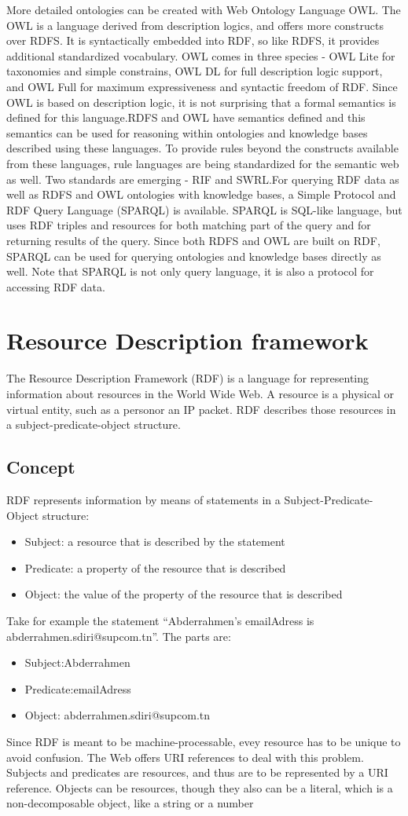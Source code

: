 \documentclass[a4paper,12pt,oneside]{report}
\begin{document}
{{More detailed ontologies can be created with Web Ontology Language OWL. The OWL is a language derived from description logics, and offers more constructs over RDFS. It is syntactically embedded into RDF, so like RDFS, it provides additional standardized vocabulary. OWL comes in three species - OWL Lite for taxonomies and simple constrains, OWL DL for full description logic support, and OWL Full for maximum expressiveness and syntactic freedom of RDF. Since OWL is based on description logic, it is not surprising that a formal semantics is defined for this language.RDFS and OWL have semantics defined and this semantics can be used for reasoning within ontologies and knowledge bases described using these languages. To provide rules beyond the constructs available from these languages, rule languages are being standardized for the semantic web as well. Two standards are emerging - RIF and SWRL.For querying RDF data as well as RDFS and OWL ontologies with knowledge bases, a Simple Protocol and RDF Query Language (SPARQL) is available. SPARQL is SQL-like language, but uses RDF triples and resources for both matching part of the query and for returning results of the query. Since both RDFS and OWL are built on RDF, SPARQL can be used for querying ontologies and knowledge bases directly as well. Note that SPARQL is not only query language, it is also a protocol for accessing RDF data.}
\section{Resource Description framework}
{The Resource Description Framework (RDF) is a language for representing information about resources in the World Wide Web. A resource is a physical or virtual entity, such as a personor an IP packet. RDF describes those resources in a subject-predicate-object structure.}
\subsection{Concept}
{RDF represents information by means of statements in a Subject-Predicate-Object structure:
\begin{itemize}
\item {Subject: a resource that is described by the statement}
\item {Predicate: a property of the resource that is described}
\item {Object: the value of the property of the resource that is described}
\end{itemize} 
{Take for example the statement “Abderrahmen's emailAdress is abderrahmen.sdiri@supcom.tn”. The parts are:
\begin{itemize}
\item {Subject:Abderrahmen }
\item {Predicate:emailAdress}
\item {Object: abderrahmen.sdiri@supcom.tn}
\end{itemize}
{Since RDF is meant to be machine-processable, evey resource has to be unique to avoid confusion. The Web offers URI references to deal with this problem. Subjects and predicates are resources, and thus are to be represented by a URI reference. Objects can be resources, though they also can be a literal, which is a non-decomposable object, like a string or a number}
}}}
\end{document}

